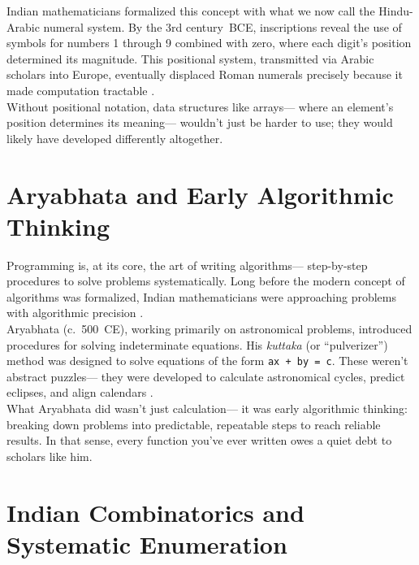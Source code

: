 Indian mathematicians formalized this concept with what we now call the Hindu-Arabic numeral system. By the 3rd century~BCE, inscriptions reveal the use of symbols for numbers 1 through 9 combined with zero, where each digit’s position determined its magnitude. This positional system, transmitted via Arabic scholars into Europe, eventually displaced Roman numerals precisely because it made computation tractable \cite{wiki_indian_math}.\\

Without positional notation, data structures like arrays---%
where an element’s position determines its meaning---%
wouldn’t just be harder to use; they would likely have developed differently altogether.

\section{Aryabhata and Early Algorithmic Thinking}

Programming is, at its core, the art of writing algorithms---%
step-by-step procedures to solve problems systematically. Long before the modern concept of algorithms was formalized, Indian mathematicians were approaching problems with algorithmic precision \cite{vajiram_ravi}.\\

Aryabhata (c.~500~CE), working primarily on astronomical problems, introduced procedures for solving indeterminate equations. His \emph{kuttaka} (or ``pulverizer'') method was designed to solve equations of the form \texttt{ax + by = c}. These weren’t abstract puzzles---%
they were developed to calculate astronomical cycles, predict eclipses, and align calendars \cite{mj_college}.\\

What Aryabhata did wasn’t just calculation---%
it was early algorithmic thinking: breaking down problems into predictable, repeatable steps to reach reliable results. In that sense, every function you’ve ever written owes a quiet debt to scholars like him.

\section{Indian Combinatorics and Systematic Enumeration}

